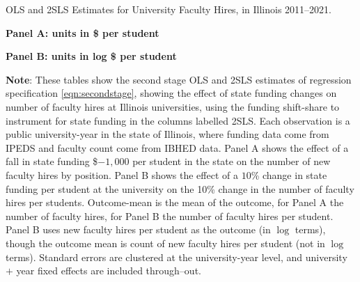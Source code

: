 \begin{table}[H]
    \singlespacing
    \centering
    \caption{OLS and 2SLS Estimates for University Faculty Hires, in Illinois 2011--2021.}

    \textbf{Panel A: units in \$ per student}

    \makebox[\textwidth][c]{}
    
    \textbf{Panel B: units in log \$ per student}
    
    \makebox[\textwidth][c]{}
    \label{tab:facultyhires-illinois-reg}
    \vspace{-0.5cm}
    \justify
    \footnotesize
    \textbf{Note}:
    These tables show the second stage OLS and 2SLS estimates of regression specification \eqref{eqn:secondstage}, showing the effect of state funding changes on number of faculty hires at Illinois universities, using the funding shift-share to instrument for state funding in the columns labelled 2SLS.
    Each observation is a public university-year in the state of Illinois, where funding data come from IPEDS and faculty count come from IBHED data.
    Panel A shows the effect of a fall in state funding \$$-1,000$ per student in the state on the number of new faculty hires by position.
    Panel B shows the effect of a $10$\% change in state funding per student at the university on the 10\% change in the number of faculty hires per students.
    Outcome-mean is the mean of the outcome, for Panel A the number of faculty hires, for Panel B the number of faculty hires per student.
    Panel B uses new faculty hires per student as the outcome (in $\log$ terms), though the outcome mean is count of new faculty hires per student (not in $\log$ terms).
    Standard errors are clustered at the university-year level, and university $+$ year fixed effects are included through--out.
\end{table}

